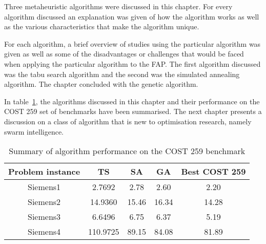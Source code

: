 Three metaheuristic algorithms were discussed in this chapter. For every algorithm discussed an explanation was given of how the algorithm works as well as the various characteristics that make the algorithm unique.

For each algorithm, a brief overview of studies using the particular algorithm was given as well as some of the disadvantages or challenges that would be faced when applying the particular algorithm to the \gls{FAP}.
The first algorithm discussed was the tabu search algorithm and the second was the simulated annealing algorithm. The chapter concluded with the genetic algorithm. 

In table~\ref{tab:summary1}, the algorithms discussed in this chapter and their performance on the \gls{COST} 259 set of benchmarks have been summarised.
The next chapter presents a discussion on a class of algorithm that is new to optimisation research, namely swarm intelligence.
\begin{table}[H]
\label{tbl:summaryMetaTable}
\begin{center}
	\begin{tabular}{| c | c | c | c | c |}
	\hline
	Problem instance & \gls{TS} & \gls{SA} & \gls{GA} & Best \gls{COST} 259 \\ \hline
	Siemens1 & 2.7692 & 2.78 & 2.60 & 2.20 \\ \hline
	Siemens2 & 14.9360 & 15.46 & 16.34 & 14.28 \\ \hline
	Siemens3 & 6.6496 & 6.75 & 6.37 & 5.19 \\ \hline
	Siemens4 & 110.9725 & 89.15 & 84.08 & 81.89 \\ \hline
	\end{tabular}
\caption{Summary of algorithm performance on the \gls{COST} 259 benchmark}
\label{tab:summary1}
\end{center}
\end{table}

